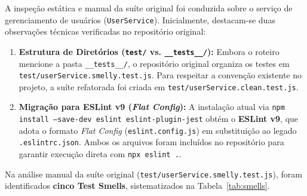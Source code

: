 \documentclass[11pt, a4paper]{article}
\begin{document}
A inspeção estática e manual da suíte original foi conduzida sobre o serviço de gerenciamento de usuários (\texttt{UserService}). Inicialmente, destacam-se duas observações técnicas verificadas no repositório original:

\begin{enumerate}
    \item \textbf{Estrutura de Diretórios (\texttt{test/} vs. \texttt{\_\_tests\_\_/}):} Embora o roteiro mencione a pasta \texttt{\_\_tests\_\_/}, o repositório original organiza os testes em \texttt{test/userService.smelly.test.js}. Para respeitar a convenção existente no projeto, a suíte refatorada foi criada em \texttt{test/userService.clean.test.js}.
    \item \textbf{Migração para ESLint v9 (\textit{Flat Config}):} A instalação atual via \texttt{npm install --save-dev eslint eslint-plugin-jest} obtém o \textbf{ESLint v9}, que adota o formato \textit{Flat Config} (\texttt{eslint.config.js}) em substituição ao legado \texttt{.eslintrc.json}. Ambos os arquivos foram incluídos no repositório para garantir execução direta com \texttt{npx eslint .}.
\end{enumerate}

Na análise manual da suíte original (\texttt{test/userService.smelly.test.js}), foram identificados \textbf{cinco Test Smells}, sistematizados na Tabela~\ref{tab:smells}.
\end{document}
